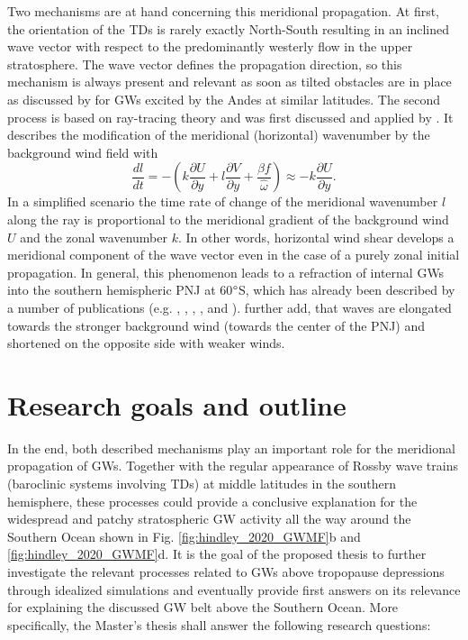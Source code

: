 Two mechanisms are at hand concerning this meridional propagation. At first, the orientation of the TDs is rarely exactly North-South resulting in an inclined wave vector with respect to the predominantly westerly flow in the upper stratosphere. The wave vector defines the propagation direction, so this mechanism is always present and relevant as soon as tilted obstacles are in place as discussed by \textcite{preusse_space-based_2002} for GWs excited by the Andes at similar latitudes. The second process is based on ray-tracing theory and was first discussed and applied by \textcite{dunkerton_dunkerton_inertiagravity_1984}. It describes the modification of the meridional (horizontal) wavenumber by the background wind field with
%
\begin{equation}
    \frac{dl}{dt} = -(k \frac{\partial U}{\partial y} + l \frac{\partial V}{\partial y} + \frac{\beta f}{\hat{\omega}})
    \approx -k \frac{\partial U}{\partial y}.
    \label{equ:meridionalRefraction}
\end{equation}
%
In a simplified scenario the time rate of change of the meridional wavenumber $l$ along the ray is proportional to the meridional gradient of the background wind $U$ and the zonal wavenumber $k$. In other words, horizontal wind shear develops a meridional component of the wave vector even in the case of a purely zonal initial propagation. In general, this phenomenon leads to a refraction of internal GWs into the southern hemispheric PNJ at 60$\degree$S, which has already been described by a number of publications (e.g. \cite{dunkerton_dunkerton_inertiagravity_1984}, \cite{preusse_space-based_2002}, \cite{sato_origins_2009}, \cite{sato_gravity_2012}, \cite{ehard_horizontal_2017} and \cite{jiang_stratospheric_2019}). \textcite{jiang_stratospheric_2019} further add, that waves are elongated towards the stronger background wind (towards the center of the PNJ) and shortened on the opposite side with weaker winds.

\section{Research goals and outline}
\label{sec:goals}
%
In the end, both described mechanisms play an important role for the meridional propagation of GWs. Together with the regular appearance of Rossby wave trains (baroclinic systems involving TDs) at middle latitudes in the southern hemisphere, these processes could provide a conclusive explanation for the widespread and patchy stratospheric GW activity all the way around the Southern Ocean shown in Fig. \ref{fig:hindley_2020_GWMF}b and \ref{fig:hindley_2020_GWMF}d. It is the goal of the proposed thesis to further investigate the relevant processes related to GWs above tropopause depressions through idealized simulations and eventually provide first answers on its relevance for explaining the discussed GW belt above the Southern Ocean. More specifically, the Master's thesis shall answer the following research questions:
%

